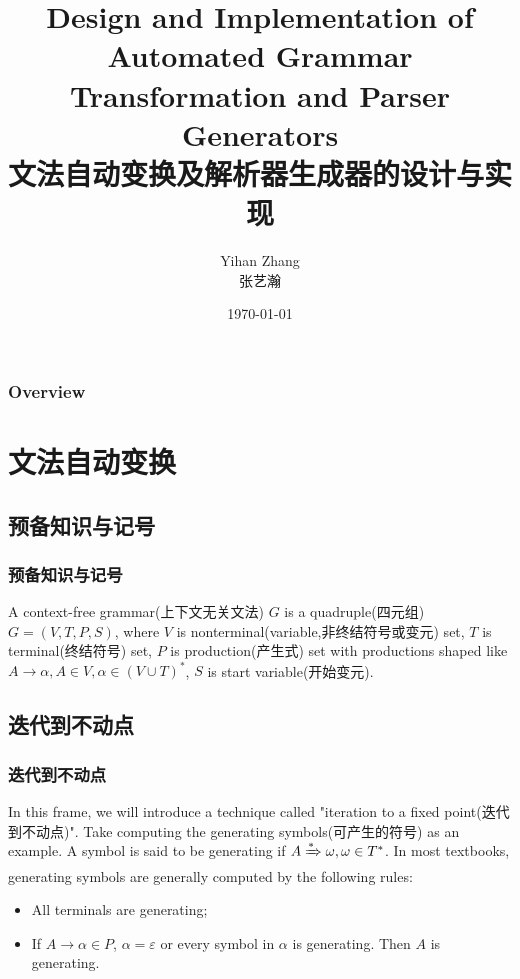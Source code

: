 \documentclass{beamer}
\title[Short title]{Design and Implementation of Automated Grammar Transformation and Parser Generators\\文法自动变换及解析器生成器的设计与实现} %
\author{Yihan Zhang\\张艺瀚} %
\institute[NEU] %
{
Northeastern University \\ %
\medskip
\textit{zhng1573@hotmail.com} %
}
\date{\today} %
\begin{document}
\begin{frame}
\titlepage %
\end{frame}

\begin{frame}
\frametitle{Overview} %
\tableofcontents %
\end{frame}

\section{文法自动变换}
\subsection{预备知识与记号}
\begin{frame}
\frametitle{预备知识与记号}
\begin{definition}
A context-free grammar(上下文无关文法) $G$ is a quadruple(四元组) $G=(V,T,P,S)$, where $V$ is nonterminal(variable,非终结符号或变元) set, $T$ is terminal(终结符号) set, $P$ is production(产生式) set with productions shaped like $A\to \alpha, A\in V, \alpha\in (V\cup T)^*$, $S$ is start variable(开始变元).
\end{definition}
\end{frame}

\subsection{迭代到不动点}
\begin{frame}
\frametitle{迭代到不动点}
In this frame, we will introduce a technique called "iteration to a fixed point(迭代到不动点)". Take computing the generating symbols(可产生的符号) as an example. A symbol is said to be generating if $A\xRightarrow[]{*} \omega, \omega\in T^*$. In most textbooks, generating symbols are generally computed by the following rules:
\begin{itemize}
\item All terminals are generating;
\item If $A\to \alpha\in P$, $\alpha=\varepsilon$ or every symbol in $\alpha$ is generating. Then $A$ is generating.
\end{itemize}
\end{frame}
\end{document}
